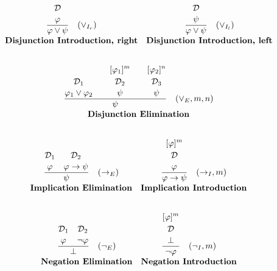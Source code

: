 \[
\begin{array}{c c}
\frac{\displaystyle \overset{\displaystyle\mathcal{D} \strut} {\varphi 
\strut}}{\displaystyle \varphi \vee \psi \strut} \quad (\vee_{I_r}) 
& \frac{\displaystyle \overset{\displaystyle\mathcal{D} \strut} {\psi \strut}}{\displaystyle \varphi \vee \psi \strut} \quad (\vee_{I_l}) \\[5pt]
\textbf{Disjunction Introduction, right} & \textbf{Disjunction Introduction, left} \\[10pt]

\end{array}
\]

\[
\begin{array}{c c}
\multicolumn{2}{c}{
\frac{\overset{\displaystyle\mathcal{D}_1 \strut} {\displaystyle\varphi_1 \vee \varphi_2 \strut} \quad \quad \overset{\displaystyle[\varphi_1]^m\strut}{\overset{\displaystyle\mathcal{D}_2 \strut} {\displaystyle\psi 
\strut}} \quad \quad \overset{\displaystyle[\varphi_2]^n\strut}{\overset{\displaystyle\mathcal{D}_3 \strut} {\displaystyle\psi 
\strut}}}{\displaystyle\psi\strut} \quad (\vee_E, m, n)
} \\[5pt]
\multicolumn{2}{c}{\textbf{Disjunction Elimination}} \\[10pt]
\end{array}
\]

\[
\begin{array}{c c}
\frac{\overset{\displaystyle\mathcal{D}_1\strut}{\displaystyle \varphi \strut}\quad \overset{\displaystyle\mathcal{D}_2\strut} {\displaystyle \varphi \to \psi \strut}}{\displaystyle\psi\strut} \quad (\to_E) 
& \frac{\overset{\displaystyle[\varphi]^m\strut}{\overset{\displaystyle\mathcal{D} \strut} {\displaystyle\varphi 
\strut}}}{\displaystyle \varphi \to \psi \strut} \quad (\to_I, m) \\[5pt]
\textbf{Implication Elimination} & \textbf{Implication Introduction}\\[10pt]
\end{array}
\]

\[
\begin{array}{c c}
\frac{\overset{\displaystyle\mathcal{D}_1\strut}{\displaystyle \varphi \strut}\quad \overset{\displaystyle\mathcal{D}_2\strut} {\displaystyle \neg \varphi \strut}}{\displaystyle\bot\strut} \quad (\neg_E) 
& \frac{\overset{\displaystyle[\varphi]^m\strut}{\overset{\displaystyle\mathcal{D} \strut} {\displaystyle\bot 
\strut}}}{\displaystyle\neg \varphi\strut} \quad (\neg_I, m) \\[5pt]
\textbf{Negation Elimination} & \textbf{Negation Introduction}\\[10pt]
\end{array}
\]


